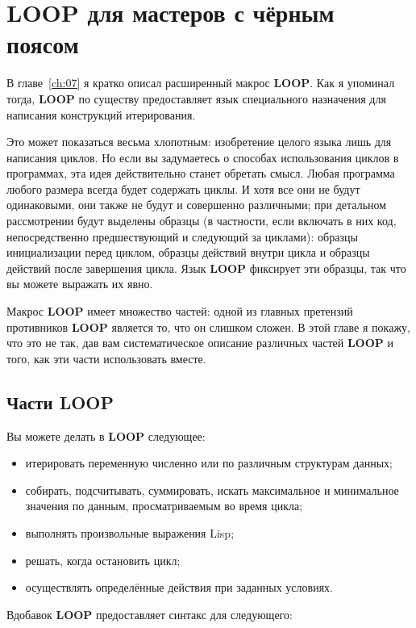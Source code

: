 \chapter{LOOP для мастеров с чёрным поясом}
\label{ch:22}

В главе~\ref{ch:07} я кратко описал расширенный макрос \textbf{LOOP}. Как я упоминал
тогда, \textbf{LOOP} по существу предоставляет язык специального назначения для написания
конструкций итерирования.

Это может показаться весьма хлопотным: изобретение целого языка лишь для написания
циклов. Но если вы задумаетесь о способах использования циклов в программах, эта идея
действительно станет обретать смысл. Любая программа любого размера всег\-да будет содержать
циклы. И хотя все они не будут одинаковыми, они также не будут и совершенно различными;
при детальном рассмотрении будут выделены образцы (в частности, если включать в них код,
непосредственно предшествующий и следующий за циклами): образцы инициализации перед
циклом, образцы действий внутри цикла и образцы действий после завершения цикла. Язык
\textbf{LOOP} фиксирует эти образцы, так что вы можете выражать их явно.

Макрос \textbf{LOOP} имеет множество частей: одной из главных претензий противников
\textbf{LOOP} является то, что он слишком сложен. В этой главе я покажу, что это не так,
дав вам систематическое описание различных частей \textbf{LOOP} и того, как эти части
использовать вместе.

\section{Части LOOP}


Вы можете делать в \textbf{LOOP} следующее:

\begin{itemize}
\item итерировать переменную численно или по различным структурам данных;
\item собирать, подсчитывать, суммировать, искать максимальное и минимальное значения по
  данным, просматриваемым во время цикла;
\item выполнять произвольные выражения Lisp;
\item решать, когда остановить цикл;
\item осуществлять определённые действия при заданных условиях.
\end{itemize}

Вдобавок \textbf{LOOP} предоставляет синтакс для следующего:

